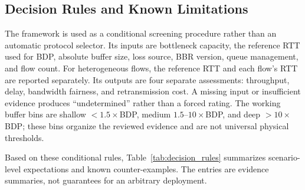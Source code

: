 \documentclass[a4paper,fleqn]{cas-sc}
\begin{document}
\subsection{Decision Rules and Known Limitations}
\label{sec:framework_rules}

The framework is used as a conditional screening procedure rather than an
automatic protocol selector. Its inputs are bottleneck capacity, the reference
RTT used for BDP, absolute buffer size, loss source, BBR version, queue
management, and flow count. For heterogeneous flows, the reference RTT and each
flow's RTT are reported separately. Its outputs are four separate assessments:
throughput, delay, bandwidth fairness, and retransmission cost. A missing input
or insufficient evidence produces ``undetermined'' rather than a forced rating.
The working buffer bins are shallow $<1.5\times$BDP, medium
$1.5$--$10\times$BDP, and deep $>10\times$BDP; these bins organize the reviewed
evidence and are not universal physical thresholds.

Based on these conditional rules, Table~\ref{tab:decision_rules} summarizes
scenario-level expectations and known counter-examples. The entries are evidence
summaries, not guarantees for an arbitrary deployment.
\end{document}
